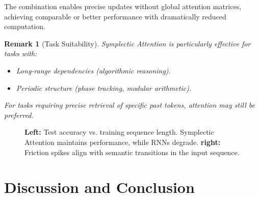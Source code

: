 \documentclass[12pt,letterpaper,twoside]{article}
\newtheorem{remarque}{Remark}[section]
\begin{document}
The combination enables precise updates without global attention matrices, achieving comparable or better performance with dramatically reduced computation.

\begin{remarque}[Task Suitability]
Symplectic Attention is particularly effective for tasks with:
\begin{itemize}
\item Long-range dependencies (algorithmic reasoning).
\item Periodic structure (phase tracking, modular arithmetic).
\end{itemize}
For tasks requiring precise retrieval of specific past tokens, attention may still be preferred.
\end{remarque}

\begin{figure}[htbp]
\centering
{}
\hfill
{}
\caption{\textbf{Left:} Test accuracy vs. training sequence length. Symplectic Attention maintains performance, while RNNs degrade. \textbf{right:} Friction spikes align with semantic transitions in the input sequence.}
\label{fig:empirical-symplectic}
\end{figure}

\section{Discussion and Conclusion}
\end{document}
